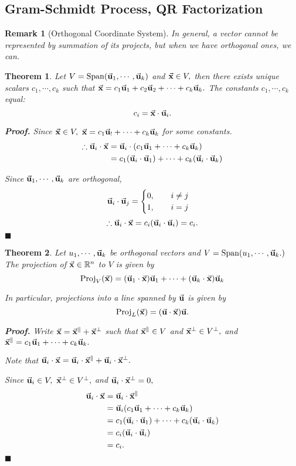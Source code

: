 \documentclass[12pt, a4paper]{article}
\newtheorem{thm}{Theorem}[subsection]
\newtheorem*{rmk}{\indent Remark}
\newenvironment*{prf}{\par\indent\textbf{\textit{Proof. }}}{\hfill $\blacksquare$\par}
\def\R{{\mathbb{R}}}
\def\Span{\mathrm{Span}}
\def\Proj{\mathrm{Proj}}
\def\vecx{\va{x}}
\def\vecu{\va{u}}
\begin{document}
\subsection{Gram-Schmidt Process, QR Factorization}
\begin{rmk}[Orthogonal Coordinate System]In general, a vector cannot be represented by summation of its projects, but when we have orthogonal ones, we can.\end{rmk}
\begin{thm}
	Let $V=\Span\qty(\vecu_1,\cdots,\vecu_k)$ and $\vecx\in V,$ then there exists unique scalars $c_1,\cdots,c_k$ such that $\vecx=c_1\vecu_1+c_2\vecu_2+\cdots+c_k\vecu_k.$ The constants $c_1,\cdots,c_k$ equal: \[c_i=\vecx\cdot\vecu_i.\]
	\begin{prf}
		Since $\vecx\in V,$ $\vecx=c_1\vecu_!+\cdots+c_k\vecu_k$ for some constants.\[\begin{aligned}\therefore \vecu_i\cdot\vecx&=\vecu_i\cdot\qty(c_1\vecu_1+\cdots+c_k\vecu_k)\\&=c_1\qty(\vecu_i\cdot\vecu_1)+\cdots+c_k\qty(\vecu_i\cdot\vecu_k)\end{aligned}\]\par Since $\vecu_1,\cdots,\vecu_k$ are orthogonal, \[\vecu_i\cdot\vecu_j=\begin{cases}0,\qquad i\neq j\\1,\qquad i=j\end{cases}\]\[\therefore\vecu_i\cdot\vecx=c_i\qty(\vecu_i\cdot\vecu_i)=c_i.\]
	\end{prf}
\end{thm}
\begin{thm}
	Let $u_1,\cdots,\vecu_k$ be orthogonal vectors and $V=\Span\qty(u_1,\cdots,\vecu_k.)$ The projection of $\vecx\in\R^n$ to $V$ is given by \[\Proj_V\qty(\vecx)=\qty(\vecu_1\cdot\vecx)\vecu_1+\cdots+\qty(\vecu_k\cdot\vecx)\vecu_k\]\par In particular, projections into a line spanned by $\vecu$ is given by \[\Proj_L\qty(\vecx)=\qty(\vecu\cdot\vecx)\vecu.\]
	\begin{prf}
		Write $\vecx=\vecx^\parallel+\vecx^\perp$ such that $\vecx^\parallel\in V$ and $\vecx^\perp\in V^\perp,$ and $\vecx^\parallel=c_1\vecu_1+\cdots+c_k\vecu_k.$\par Note that $\vecu_i\cdot\vecx=\vecu_i\cdot\vecx^\parallel+\vecu_i\cdot\vecx^\perp.$\par Since $\vecu_i\in V,\ \vecx^\perp\in V^\perp,$ and $\vecu_i\cdot\vecx^\perp=0,$ \[\begin{aligned}\vecu_i\cdot\vecx&=\vecu_i\cdot\vecx^\parallel\\&=\vecu_i\qty(c_1\vecu_1+\cdots+c_k\vecu_k)\\&=c_1\qty(\vecu_i\cdot\vecu_1)+\cdots+c_k\qty(\vecu_i\cdot\vecu_k)\\&=c_i\qty(\vecu_i\cdot\vecu_i)\\&=c_i.\end{aligned}\]
	\end{prf}	
\end{thm}
\end{document}
